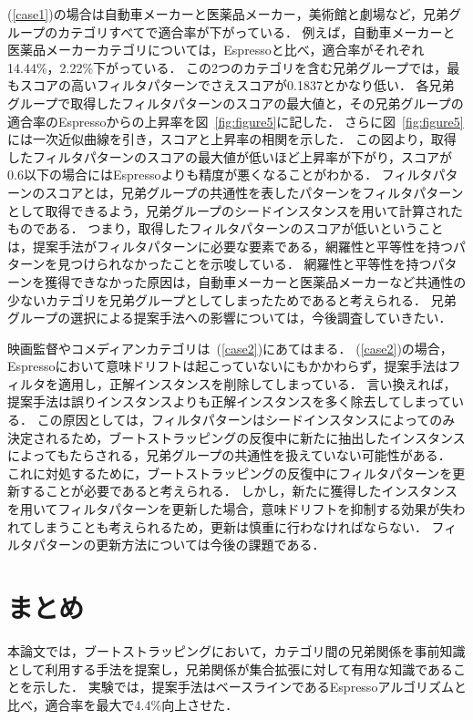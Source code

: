 \documentclass[japanese]{jnlp_1.4}
\begin{document}
(\ref{case1})の場合は自動車メーカーと医薬品メーカー，美術館と劇場など，兄弟グループのカテゴリすべてで適合率が下がっている．
例えば，自動車メーカーと医薬品メーカーカテゴリについては，Espressoと比べ，適合率がそれぞれ14.44\%，2.22\%下がっている．
この2つのカテゴリを含む兄弟グループでは，最もスコアの高いフィルタパターンでさえスコアが0.1837とかなり低い．
各兄弟グループで取得したフィルタパターンのスコアの最大値と，その兄弟グループの適合率のEspressoからの上昇率を図~\ref{fig:figure5}に記した．
さらに図~\ref{fig:figure5}には一次近似曲線を引き，スコアと上昇率の相関を示した．
この図より，取得したフィルタパターンのスコアの最大値が低いほど上昇率が下がり，スコアが0.6以下の場合にはEspressoよりも精度が悪くなることがわかる．
フィルタパターンのスコアとは，兄弟グループの共通性を表したパターンをフィルタパターンとして取得できるよう，兄弟グループのシードインスタンスを用いて計算されたものである．
つまり，取得したフィルタパターンのスコアが低いということは，提案手法がフィルタパターンに必要な要素である，網羅性と平等性を持つパターンを見つけられなかったことを示唆している．
網羅性と平等性を持つパターンを獲得できなかった原因は，自動車メーカーと医薬品メーカーなど共通性の少ないカテゴリを兄弟グループとしてしまったためであると考えられる．
兄弟グループの選択による提案手法への影響については，今後調査していきたい．


映画監督やコメディアンカテゴリは~(\ref{case2})にあてはまる．
(\ref{case2})の場合，Espressoにおいて意味ドリフトは起こっていないにもかかわらず，提案手法はフィルタを適用し，正解インスタンスを削除してしまっている．
言い換えれば，提案手法は誤りインスタンスよりも正解インスタンスを多く除去してしまっている．
この原因としては，フィルタパターンはシードインスタンスによってのみ決定されるため，ブートストラッピングの反復中に新たに抽出したインスタンスによってもたらされる，兄弟グループの共通性を扱えていない可能性がある．
これに対処するために，ブートストラッピングの反復中にフィルタパターンを更新することが必要であると考えられる．
しかし，新たに獲得したインスタンスを用いてフィルタパターンを更新した場合，意味ドリフトを抑制する効果が失われてしまうことも考えられるため，更新は慎重に行わなければならない．
フィルタパターンの更新方法については今後の課題である．


\section{まとめ}

本論文では，ブートストラッピングにおいて，カテゴリ間の兄弟関係を事前知識として利用する手法を提案し，兄弟関係が集合拡張に対して有用な知識であることを示した．
実験では，提案手法はベースラインであるEspressoアルゴリズムと比べ，適合率を最大で4.4\%向上させた．
\end{document}
